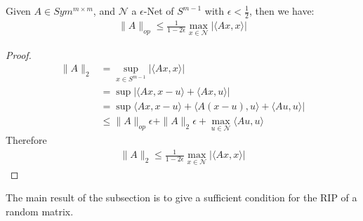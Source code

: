 \begin{lemma}
	Given $A \in Sym^{m \times m}$, and $\mathcal{N}$ a $\epsilon$-Net of $S^{m-1}$ with $\epsilon < \frac{1}{2}$, then we have:
\begin{align*}
	\|A\|_{op} \leq \frac{1}{1 - 2 \epsilon}  \max_{ x \in \mathcal{N}} |\langle Ax, x \rangle|
\end{align*}
\end{lemma}
\begin{proof}
\begin{align*}
	\|A\|_2 &= \sup_{x \in S^{m-1}}|\langle Ax , x \rangle|\\
	&= \sup |\langle Ax, x - u\rangle + \langle Ax, u \rangle|\\
	&= \sup \langle Ax, x - u\rangle + \langle A (x - u), u \rangle + \langle Au, u \rangle |\\
	&\le \|A\|_{op} \epsilon + \|A\|_2 \epsilon + \max_{ u \in \mathcal{N}} \langle Au, u\rangle
\end{align*}
Therefore
\begin{align*}
	\|A\|_2 \le \frac{1}{1- 2 \epsilon} \max_{x \in \mathcal{N}} |\langle Ax, x \rangle|
\end{align*}
\end{proof}

The main result of the subsection is to give a sufficient condition for the RIP of a random matrix. 

